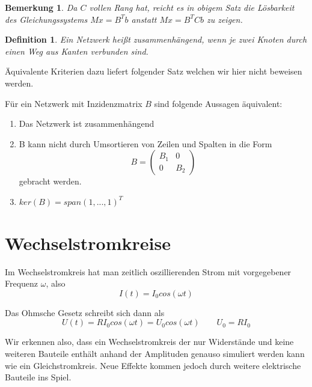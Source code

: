 \documentclass[11pt,titlepage]{article}
\begin{document}
		\newtheorem{Bemerkung}{Bemerkung}
		\begin{Bemerkung}
			Da $C$ vollen Rang hat, reicht es in obigem Satz die Lösbarkeit des Gleichungssystems $Mx = B^Tb$ anstatt $Mx = B^TCb$ zu zeigen.
		\end{Bemerkung}
		
		\newtheorem{Definition}{Definition}
		\begin{Definition}
			Ein Netzwerk heißt zusammenhängend, wenn je zwei Knoten durch einen Weg aus Kanten verbunden sind.
		\end{Definition}
	
		Äquivalente Kriterien dazu liefert folgender Satz welchen wir hier nicht beweisen werden.

		\begin{Satz}
			Für ein Netzwerk mit Inzidenzmatrix $B$ sind folgende Aussagen äquivalent:
			\begin{enumerate}
				\item Das Netzwerk ist zusammenhängend
				\item B kann nicht durch Umsortieren von Zeilen und Spalten in die Form
					\begin{displaymath}
						B = 
						\left( 
						\begin{matrix}
							B_1 & 0 \\
							0 & B_2
						\end{matrix}
						\right)
					\end{displaymath}
					gebracht werden.
				\item $ker(B) = span{(1,...,1)^T}$
			\end{enumerate}
		\end{Satz}
	\newpage
	\section{Wechselstromkreise}
	
		Im Wechselstromkreis hat man zeitlich oszillierenden Strom mit vorgegebener Frequenz $\omega$, also
		\begin{displaymath}
			I(t) = I_0 cos(\omega t)
		\end{displaymath}
		
		Das Ohmsche Gesetz schreibt sich dann als
		\begin{displaymath}
			U(t) = R I_0 cos(\omega t) = U_0 cos(\omega t) \qquad U_0 = R I_0
		\end{displaymath}
		
		Wir erkennen also, dass ein Wechselstromkreis der nur Widerstände und keine weiteren Bauteile enthält anhand der Amplituden genauso simuliert werden kann wie ein Gleichstromkreis. Neue Effekte kommen jedoch durch weitere elektrische Bauteile ins Spiel.
		
\end{document}
